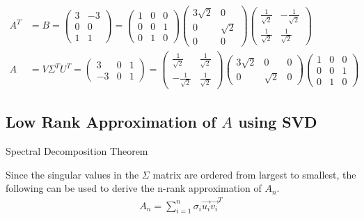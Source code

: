 \begin{align}
    A^T &= B = \begin{pmatrix}
        3 & -3 \\ 0 & 0 \\ 1 & 1
    \end{pmatrix} = \begin{pmatrix}
        1 & 0 & 0 \\ 0 & 0 & 1 \\ 0 & 1 & 0
    \end{pmatrix}
    \begin{pmatrix}
        3\sqrt{2} & 0 \\ 0 & \sqrt{2} \\ 0 & 0
    \end{pmatrix} \begin{pmatrix}
        \frac{1}{\sqrt{2}} & -\frac{1}{\sqrt{2}} \\
        \frac{1}{\sqrt{2}} & \frac{1}{\sqrt{2}}
    \end{pmatrix} \\
    A &= V \Sigma^T U^T = \begin{pmatrix}
        3 & 0 & 1 \\ -3 & 0 & 1
    \end{pmatrix} = \begin{pmatrix}
        \frac{1}{\sqrt{2}} & \frac{1}{\sqrt{2}} \\
        -\frac{1}{\sqrt{2}} & \frac{1}{\sqrt{2}}
    \end{pmatrix} \begin{pmatrix}
        3\sqrt{2} & 0 & 0 \\ 0 & \sqrt{2} & 0
    \end{pmatrix} \begin{pmatrix}
        1 & 0 & 0 \\ 0 & 0 & 1 \\ 0 & 1 & 0
    \end{pmatrix}
\end{align}

\subsection{Low Rank Approximation of \(A\) using SVD}
\begin{theorem} Spectral Decomposition Theorem

    Since the singular values in the \(\Sigma\) matrix are ordered from largest to smallest, the following can be used to derive the n-rank approximation of \(A_n\).
    \begin{align}
        A_n = \sum_{i=1}^n \sigma_i \Vec{u_i} \Vec{v_i}^T
    \end{align}
\end{theorem}

